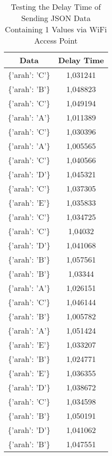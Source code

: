 \begin{table}[!h]
\centering
  \caption{Testing the Delay Time of Sending JSON Data Containing 1 Values via WiFi Access Point}
  \label{tbl:delayWiFiJSON1}
  \begin{tabular}{|c|c|}
  \hline
  Data               & Delay Time  \\ \hline
  \{'arah': 'C'\}    & 1,031241    \\ \hline
  \{'arah': 'B'\}    & 1,048823    \\ \hline
  \{'arah': 'C'\}    & 1,049194    \\ \hline
  \{'arah': 'A'\}    & 1,011389    \\ \hline
  \{'arah': 'C'\}    & 1,030396    \\ \hline
  \{'arah': 'A'\}    & 1,005565    \\ \hline
  \{'arah': 'C'\}    & 1,040566    \\ \hline
  \{'arah': 'D'\}    & 1,045321    \\ \hline
  \{'arah': 'C'\}    & 1,037305    \\ \hline
  \{'arah': 'E'\}    & 1,035833    \\ \hline
  \{'arah': 'C'\}    & 1,034725    \\ \hline
  \{'arah': 'C'\}    & 1,04032     \\ \hline
  \{'arah': 'D'\}    & 1,041068    \\ \hline
  \{'arah': 'B'\}    & 1,057561    \\ \hline
  \{'arah': 'B'\}    & 1,03344     \\ \hline
  \{'arah': 'A'\}    & 1,026151    \\ \hline
  \{'arah': 'C'\}    & 1,046144    \\ \hline
  \{'arah': 'B'\}    & 1,005782    \\ \hline
  \{'arah': 'A'\}    & 1,051424    \\ \hline
  \{'arah': 'E'\}    & 1,033207    \\ \hline
  \{'arah': 'B'\}    & 1,024771    \\ \hline
  \{'arah': 'E'\}    & 1,036355    \\ \hline
  \{'arah': 'D'\}    & 1,038672    \\ \hline
  \{'arah': 'C'\}    & 1,034598    \\ \hline
  \{'arah': 'B'\}    & 1,050191    \\ \hline
  \{'arah': 'D'\}    & 1,041062    \\ \hline
  \{'arah': 'B'\}    & 1,047551    \\ \hline

\end{tabular}
\end{table}

